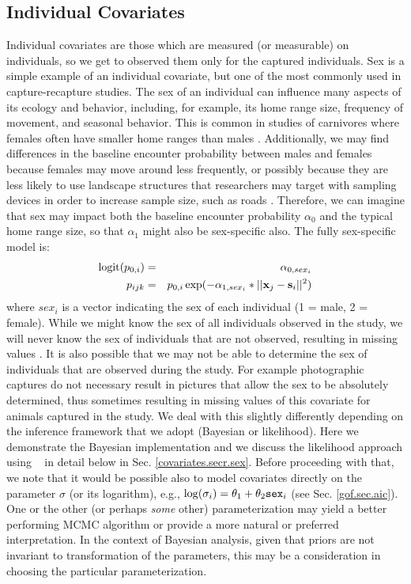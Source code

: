\subsection{Individual Covariates}
\label{covariates.sec.sex}


Individual covariates are those which are measured (or measurable) on
individuals, so we get to observed them only for the captured
individuals. Sex is a simple example of an individual covariate, but
one of the most commonly used in capture-recapture studies. 
The sex of an individual can influence many aspects of its ecology and
behavior, including, for example, its home range size, frequency of
movement, and seasonal behavior. This is common in studies of
carnivores where females often have smaller home ranges than males
\citep{gardner_etal:2010jwm, sollmann_etal:2011}. Additionally, we may
find differences in the baseline encounter probability
 between males and females
because females may move around less frequently, or possibly because
they are less likely to use landscape structures that researchers may
target with sampling devices in order to increase sample size, such as
roads \citep[e.g.][]{salom-perez_etal:2007}.
Therefore, 
we can imagine that sex may impact both the baseline encounter
probability $\alpha_{0}$ and the typical home range
size, so that
$\alpha_{1}$ might also be sex-specific also.  The fully sex-specific model is:
\begin{eqnarray*}
\mbox{logit}(p_{0,i}) &= &\alpha_{0,sex_{i}}  \\
p_{ijk} &= &p_{0,i} \exp(- \alpha_{1, sex_{i}}*||{\bf x}_{j}-{\bf s}_{i}||^2)
\end{eqnarray*}
where $sex_{i}$ is a vector indicating the sex of
each individual (1 = male, 2 = female).  While we might know the sex of all
individuals observed in the study, we will never know the
sex of individuals that are not observed,
resulting in missing values \citep{gardner_etal:2010jwm}.
It is also possible that we may not be able to determine the sex of
individuals that are observed during the study. For example photographic
captures do not necessary result in pictures that allow the sex to be absolutely
determined, thus sometimes resulting in missing values of this covariate for animals
captured in the study.   We deal with this slightly differently
depending on the inference framework 
that we adopt (Bayesian or likelihood).  Here we demonstrate the Bayesian implementation 
and we discuss the likelihood approach using \secr~ in detail
below in Sec. \ref{covariates.secr.sex}.
Before proceeding with that, we note that it would be possible also to
model covariates directly on the parameter $\sigma$ (or its
logarithm), e.g., $\log(\sigma_{i}) = \theta_{1} + \theta_{2}
\mbox{\tt sex}_{i}$ (see Sec. \ref{gof.sec.aic}). 
One or the other (or perhaps {\it some} other)
parameterization may yield a better performing MCMC algorithm or provide a
more natural or preferred interpretation.
In the context of Bayesian analysis, given that priors are not
invariant to transformation of the parameters, this may be a
consideration in choosing the particular parameterization.



